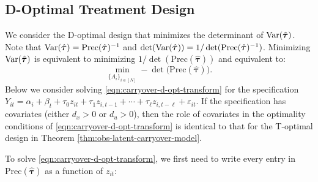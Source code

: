 	    \subsection{D-Optimal Treatment Design}\label{subsec:d-optimal-design}
	    We consider the D-optimal design that minimizes the determinant of $\mathrm{Var}(\hat{\bm{\tau}})$. Note that 
	    $\mathrm{Var}(\hat{\bm{\tau}}) = \mathrm{Prec}(\hat{\bm{\tau}})^{-1}$ and $\det(\mathrm{Var}(\hat{\bm{\tau}})) = 1/\det(\mathrm{Prec}(\hat{\bm{\tau}})^{-1}) $. Minimizing $\mathrm{Var}(\hat{\bm{\tau}})$ is equivalent to minimizing $1/\det(\mathrm{Prec}(\hat{\bm{\tau}}))$ and equivalent to:
	\begin{equation}\label{eqn:carryover-d-opt-transform}
	\min_{\{A_i\}_{i \in [N]}} -\det \big( \mathrm{Prec}(\hat{\bm{\tau}}) \big).
	\end{equation}
	Below we consider solving \eqref{eqn:carryover-d-opt-transform} for the specification $Y_{it}= \alpha_i +  \beta_t + \tau_0 z_{it} + \tau_1 z_{i,t-1} + \cdots + \tau_{\ell} z_{i,t-\ell} +  \varepsilon_{it}$.
	If the specification has covariates (either $d_x > 0$ or $d_u > 0$), then the role of covariates in the optimality conditions of \eqref{eqn:carryover-d-opt-transform} is identical to that for the T-optimal design in Theorem \ref{thm:obs-latent-carryover-model}.
	
	To solve \eqref{eqn:carryover-d-opt-transform}, we first need to write every entry in $\mathrm{Prec}(\hat{\bm{\tau}})$ as a function of  $z_{it}$:
		
